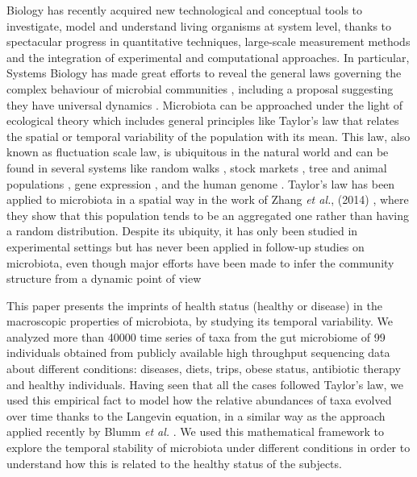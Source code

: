 Biology has recently acquired new technological and conceptual tools to investigate, model and understand living organisms at system level, thanks to spectacular progress in quantitative techniques, large-scale measurement methods and the integration of experimental and computational approaches. In particular, Systems Biology has made great efforts to reveal the general laws governing the complex behaviour of microbial communities \cite{sysbio&microb, msys1, metasysbio}, including a proposal suggesting they have universal dynamics \cite{uni_dynam}. Microbiota can be approached under the light of ecological theory which includes general principles like Taylor's law \cite{pretaylor,taylor} that relates the spatial or temporal variability of the population with its mean. This law, also known as fluctuation scale law, is ubiquitous in the natural world and can be found in several systems like random walks \cite{randomwalks}, stock markets \cite{economics1, economics2}, tree \cite{cohen_taylor} and animal populations \cite{taylor, animal1, animal2}, gene expression \cite{genexpress}, and the human genome \cite{genome}. Taylor's law has been applied to microbiota in a spatial way in the work of Zhang {\it et al.}, (2014) \cite{isme1}, where they show that this population tends to be an aggregated one rather than having a random distribution. Despite its ubiquity, it has only been studied in experimental settings \cite{cohen_bac, ramslayer} but has never been applied in follow-up studies on microbiota, even though major efforts have been made to infer the community structure from a dynamic point of view \cite{cobas, schloss, ravel}  

This paper presents the imprints of health status (healthy or disease) in the macroscopic properties of microbiota, by studying its temporal variability. We analyzed more than 40000 time series of taxa from the gut microbiome of 99 individuals obtained from publicly available high throughput sequencing data about different conditions: diseases, diets, trips, obese status, antibiotic therapy and healthy individuals. Having seen that all the cases followed Taylor's law, we used this empirical fact to model how the relative abundances of taxa evolved over time thanks to the Langevin equation, in a similar way as the approach applied recently by Blumm {\it et al.} \cite{ranking}. We used this mathematical framework to explore the temporal stability of microbiota under different conditions in order to understand how this is related to the healthy status of the subjects.